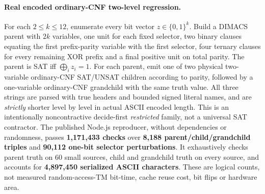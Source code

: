 \documentclass[11pt]{article}
\begin{document}
\paragraph{Real encoded ordinary-CNF two-level regression.}
For each $2\le k\le12$, enumerate every bit vector $z\in\{0,1\}^k$. Build a DIMACS parent with $2k$ variables, one unit for each fixed selector, two binary clauses equating the first prefix-parity variable with the first selector, four ternary clauses for every remaining XOR prefix and a final positive unit on total parity. The parent is SAT iff $\bigoplus_i z_i=1$. For each parent, emit one of two physical two-variable ordinary-CNF SAT/UNSAT children according to parity, followed by a one-variable ordinary-CNF grandchild with the same truth value. All three strings are parsed with true headers and bounded signed literal names, and are \emph{strictly} shorter level by level in actual ASCII encoded length. This is an intentionally noncontractive decide-first \emph{restricted} family, not a universal SAT contractor.
The published Node.js reproducer, without dependencies or randomness, passes \textbf{1,171,433 checks} over \textbf{8,188 parent/child/grandchild triples} and \textbf{90,112 one-bit selector perturbations}. It exhaustively checks parent truth on 60 small sources, child and grandchild truth on every source, and accounts for \textbf{4,897,450 serialized ASCII characters}. These are logical counts, not measured random-access-TM bit-time, cache reuse cost, bit flips or hardware area.
\end{document}
